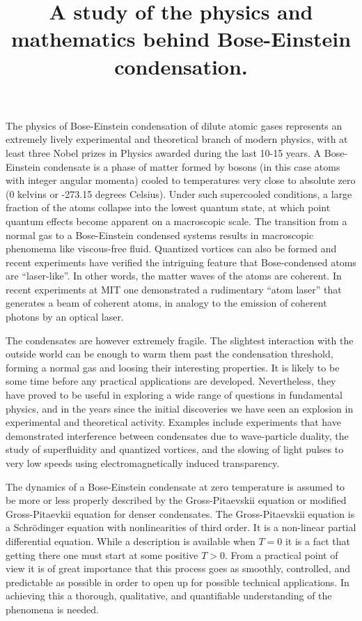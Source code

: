 \documentclass[a4paper,12pt,twoside]{article}
\author{}
\title{A study of the physics and mathematics behind Bose-Einstein condensation.}
\begin{document}
\maketitle


The physics of  Bose-Einstein condensation of dilute atomic gases
represents an extremely lively experimental and theoretical branch of modern 
physics, with at least three Nobel prizes in Physics awarded during the last 10-15 years. 
A Bose-Einstein condensate
is a phase of matter formed by bosons (in this case atoms with integer angular momenta) 
cooled to temperatures very close to absolute zero (0 kelvins or -273.15 degrees Celsius). 
Under such supercooled conditions, a large fraction of the atoms collapse into the lowest
quantum state, at 
which point quantum effects become apparent on a macroscopic scale. The 
transition from a normal gas to a Bose-Einstein condensed systems results in macroscopic
phenomema like viscous-free fluid.
Quantized vortices can also be formed and 
recent experiments have 
verified the intriguing feature that Bose-condensed atoms are ``laser-like''. In other words, 
the matter waves of the atoms are coherent. In recent experiments at MIT one  
demonstrated a rudimentary ``atom laser'' that generates a beam of coherent atoms, 
in analogy to the emission of coherent photons by an optical laser.


The condensates are however extremely fragile. The slightest interaction with the outside world can be 
enough to warm them past the condensation threshold, forming a normal gas and loosing their
interesting properties. 
It is likely to be some time before any practical applications are developed.
Nevertheless, they have proved to be useful in exploring a wide range of questions in
fundamental physics, 
and in the years since the initial discoveries we have seen an explosion in experimental and
theoretical activity. 
Examples include experiments that have demonstrated interference between condensates due
to wave-particle duality,
the study of superfluidity and quantized vortices, and the slowing of light pulses to very low speeds using 
electromagnetically induced transparency. 


The dynamics of a Bose-Einstein condensate at zero temperature is assumed to be more or less 
properly described by the Gross-Pitaevskii equation or modified Gross-Pitaevkii equation for
denser condensates. 
The Gross-Pitaevskii equation is a Schr\"odinger equation with nonlinearities of third order.
It is a non-linear partial differential equation.
While a description is available when $T=0$ 
it is a fact that getting there one must start at some positive $T>0$.  From a practical point
of view it is of great importance that
this process goes as smoothly, controlled, and predictable as possible in order to open up for
possible technical applications. In achieving this a thorough, qualitative, and quantifiable understanding of the phenomena is needed.
\end{document}
